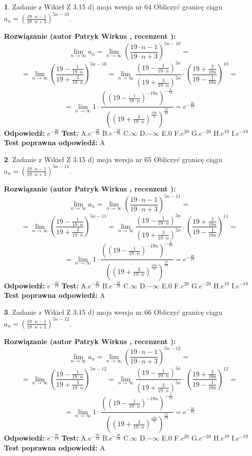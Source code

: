 \documentclass[12pt, a4paper]{article}
\theoremstyle{definition} %
\newtheorem{zad}{}
\newcommand{\zadStart}[1]{\begin{zad}#1\newline}
\newcommand{\zadStop}{\end{zad}}
\newcommand{\rozwStart}[2]{\noindent \textbf{Rozwiązanie (autor #1 , recenzent #2): }\newline}
\newcommand{\rozwStop}{\newline}
\newcommand{\odpStart}{\noindent \textbf{Odpowiedź:}\newline}
\newcommand{\odpStop}{\newline}
\newcommand{\testStart}{\noindent \textbf{Test:}\newline}
\newcommand{\testStop}{\newline}
\newcommand{\kluczStart}{\noindent \textbf{Test poprawna odpowiedź:}\newline}
\newcommand{\kluczStop}{\newline}
\begin{document}
\zadStart{Zadanie z Wikieł Z 3.15 d) moja wersja nr 64}
Obliczyć granicę ciągu $a_{n}=(\frac{19\cdot n - 1}{19 \cdot n + 3})^{5n-10}$.
\zadStop
\rozwStart{Patryk Wirkus}{}
$$\lim\limits_{n\to\infty} a_{n} = \lim\limits_{n\to\infty}(\frac{19\cdot n - 1}{19 \cdot n + 3})^{5n-10}=$$
$$=\lim\limits_{n\to\infty}(\frac{19 - \frac{1}{19\cdot n}}{19 + \frac{3}{19 \cdot n}})^{5n-10}=\lim\limits_{n\to\infty}\frac{(19 - \frac{1}{19\cdot n})^{5n}}{(19 + \frac{3}{19\cdot n})^{5n}} \cdot (\frac{19+\frac{3}{19n}}{19-\frac{1}{19n}})^{10}=$$
$$=\lim\limits_{n\to\infty} 1 \cdot \frac{((19-\frac{1}{19 \cdot n})^{-19n})^{-\frac{5}{19}}}{((19+\frac{3}{19 \cdot n})^{\frac{19n}{3}})^{\frac{15}{19}}} =e^{-\frac{20}{19}}$$
\rozwStop
\odpStart
$e^{-\frac{20}{19}}$
\odpStop
\testStart
A.$ e^{-\frac{20}{19}}$
B.$ e^{-\frac{20}{19}}$
C.$\infty$
D.$-\infty$
E.$0$
F.$e^{20}$
G.$e^{-20}$
H.$e^{19}$
I.$e^{-19}$
\testStop
\kluczStart
A
\kluczStop



\zadStart{Zadanie z Wikieł Z 3.15 d) moja wersja nr 65}
Obliczyć granicę ciągu $a_{n}=(\frac{19\cdot n - 1}{19 \cdot n + 3})^{5n-11}$.
\zadStop
\rozwStart{Patryk Wirkus}{}
$$\lim\limits_{n\to\infty} a_{n} = \lim\limits_{n\to\infty}(\frac{19\cdot n - 1}{19 \cdot n + 3})^{5n-11}=$$
$$=\lim\limits_{n\to\infty}(\frac{19 - \frac{1}{19\cdot n}}{19 + \frac{3}{19 \cdot n}})^{5n-11}=\lim\limits_{n\to\infty}\frac{(19 - \frac{1}{19\cdot n})^{5n}}{(19 + \frac{3}{19\cdot n})^{5n}} \cdot (\frac{19+\frac{3}{19n}}{19-\frac{1}{19n}})^{11}=$$
$$=\lim\limits_{n\to\infty} 1 \cdot \frac{((19-\frac{1}{19 \cdot n})^{-19n})^{-\frac{5}{19}}}{((19+\frac{3}{19 \cdot n})^{\frac{19n}{3}})^{\frac{15}{19}}} =e^{-\frac{20}{19}}$$
\rozwStop
\odpStart
$e^{-\frac{20}{19}}$
\odpStop
\testStart
A.$ e^{-\frac{20}{19}}$
B.$ e^{-\frac{20}{19}}$
C.$\infty$
D.$-\infty$
E.$0$
F.$e^{20}$
G.$e^{-20}$
H.$e^{19}$
I.$e^{-19}$
\testStop
\kluczStart
A
\kluczStop



\zadStart{Zadanie z Wikieł Z 3.15 d) moja wersja nr 66}
Obliczyć granicę ciągu $a_{n}=(\frac{19\cdot n - 1}{19 \cdot n + 3})^{5n-12}$.
\zadStop
\rozwStart{Patryk Wirkus}{}
$$\lim\limits_{n\to\infty} a_{n} = \lim\limits_{n\to\infty}(\frac{19\cdot n - 1}{19 \cdot n + 3})^{5n-12}=$$
$$=\lim\limits_{n\to\infty}(\frac{19 - \frac{1}{19\cdot n}}{19 + \frac{3}{19 \cdot n}})^{5n-12}=\lim\limits_{n\to\infty}\frac{(19 - \frac{1}{19\cdot n})^{5n}}{(19 + \frac{3}{19\cdot n})^{5n}} \cdot (\frac{19+\frac{3}{19n}}{19-\frac{1}{19n}})^{12}=$$
$$=\lim\limits_{n\to\infty} 1 \cdot \frac{((19-\frac{1}{19 \cdot n})^{-19n})^{-\frac{5}{19}}}{((19+\frac{3}{19 \cdot n})^{\frac{19n}{3}})^{\frac{15}{19}}} =e^{-\frac{20}{19}}$$
\rozwStop
\odpStart
$e^{-\frac{20}{19}}$
\odpStop
\testStart
A.$ e^{-\frac{20}{19}}$
B.$ e^{-\frac{20}{19}}$
C.$\infty$
D.$-\infty$
E.$0$
F.$e^{20}$
G.$e^{-20}$
H.$e^{19}$
I.$e^{-19}$
\testStop
\kluczStart
A
\kluczStop
\end{document}
